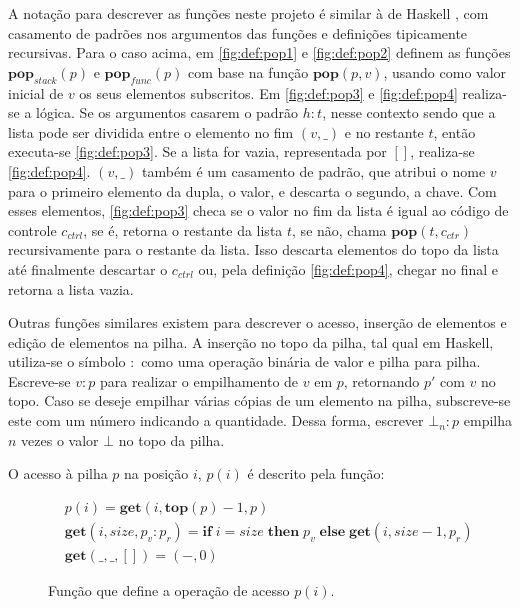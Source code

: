 A notação para descrever as funções neste projeto é similar à de Haskell \cite{HASKELL}, com casamento de padrões nos argumentos das funções e definições tipicamente recursivas. Para o caso acima, em \ref{fig:def:pop1} e \ref{fig:def:pop2} definem as funções $\mathbf{pop}_{stack}(p)$ e $\mathbf{pop}_{func}(p)$ com base na função $\mathbf{pop}(p, v)$, usando como valor inicial de $v$ os seus elementos subscritos. Em \ref{fig:def:pop3} e \ref{fig:def:pop4} realiza-se a lógica. Se os argumentos casarem o padrão $h : t$, nesse contexto sendo que a lista pode ser dividida entre o elemento no fim $(v, \_)$ e no restante $t$, então executa-se \ref{fig:def:pop3}. Se a lista for vazia, representada por $[]$, realiza-se \ref{fig:def:pop4}. $(v,\_)$ também é um casamento de padrão, que atribui o nome $v$ para o primeiro elemento da dupla, o valor, e descarta o segundo, a chave. Com esses elementos, \ref{fig:def:pop3} checa se o valor no fim da lista é igual ao código de controle $c_{ctrl}$, se é, retorna o restante da lista $t$, se não, chama $\mathbf{pop}(t, c_{ctr})$ recursivamente para o restante da lista. Isso descarta elementos do topo da lista até finalmente descartar o $c_{ctrl}$ ou, pela definição \ref{fig:def:pop4}, chegar no final e retorna a lista vazia.

Outras funções similares existem para descrever o acesso, inserção de elementos e edição de elementos na pilha. A inserção no topo da pilha, tal qual em Haskell, utiliza-se o símbolo $:$ como uma operação binária de valor e pilha para pilha. Escreve-se $v : p$ para realizar o empilhamento de $v$ em $p$, retornando $p'$ com $v$ no topo. Caso se deseje empilhar várias cópias de um elemento na pilha, subscreve-se este com um número indicando a quantidade. Dessa forma, escrever $\bot_n : p$ empilha $n$ vezes o valor $\bot$ no topo da pilha. 

O acesso à pilha $p$ na posição $i$, $p(i)$ é descrito pela função:

\begin{figure}[ht]
	\begin{align}
	&p(i) = \mathbf{get}(i, \mathbf{top}(p) - 1, p) \label{fig:def:px1}\\
	&\mathbf{get}(i, size, p_v : p_r) = \mathbf{if}\;i = size \;\mathbf{then}\;p_v\;\mathbf{else}\;\mathbf{get}(i, size - 1, p_r) \label{fig:def:px2}\\
	&\mathbf{get}(\_, \_, []) = (-,0) \label{fig:def:px3}
	\end{align}
	\caption{Função que define a operação de acesso $p(i)$.}
	\label{fig:def:px}
\end{figure}

